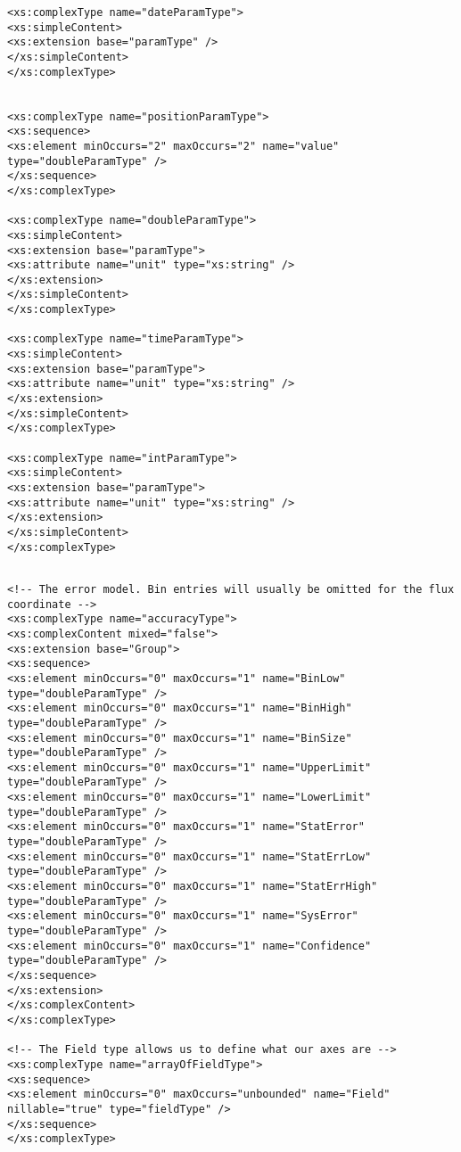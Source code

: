 {\begin{flushleft}
\begin{fmppage}
\begin{verbatim}
<xs:complexType name="dateParamType">
<xs:simpleContent>
<xs:extension base="paramType" />
</xs:simpleContent>
</xs:complexType>


<xs:complexType name="positionParamType">
<xs:sequence>
<xs:element minOccurs="2" maxOccurs="2" name="value" type="doubleParamType" />
</xs:sequence>
</xs:complexType>

<xs:complexType name="doubleParamType">
<xs:simpleContent>
<xs:extension base="paramType">
<xs:attribute name="unit" type="xs:string" />
</xs:extension>
</xs:simpleContent>
</xs:complexType>

<xs:complexType name="timeParamType">
<xs:simpleContent>
<xs:extension base="paramType">
<xs:attribute name="unit" type="xs:string" />
</xs:extension>
</xs:simpleContent>
</xs:complexType>

<xs:complexType name="intParamType">
<xs:simpleContent>
<xs:extension base="paramType">
<xs:attribute name="unit" type="xs:string" />
</xs:extension>
</xs:simpleContent>
</xs:complexType>

\end{verbatim}
\end{fmppage}

\begin{fmppage}
\begin{verbatim}

<!-- The error model. Bin entries will usually be omitted for the flux coordinate -->
<xs:complexType name="accuracyType">
<xs:complexContent mixed="false">
<xs:extension base="Group">
<xs:sequence>
<xs:element minOccurs="0" maxOccurs="1" name="BinLow" type="doubleParamType" />
<xs:element minOccurs="0" maxOccurs="1" name="BinHigh" type="doubleParamType" />
<xs:element minOccurs="0" maxOccurs="1" name="BinSize" type="doubleParamType" />
<xs:element minOccurs="0" maxOccurs="1" name="UpperLimit" type="doubleParamType" />
<xs:element minOccurs="0" maxOccurs="1" name="LowerLimit" type="doubleParamType" />
<xs:element minOccurs="0" maxOccurs="1" name="StatError" type="doubleParamType" />
<xs:element minOccurs="0" maxOccurs="1" name="StatErrLow" type="doubleParamType" />
<xs:element minOccurs="0" maxOccurs="1" name="StatErrHigh" type="doubleParamType" />
<xs:element minOccurs="0" maxOccurs="1" name="SysError" type="doubleParamType" />
<xs:element minOccurs="0" maxOccurs="1" name="Confidence" type="doubleParamType" />
</xs:sequence>
</xs:extension>
</xs:complexContent>
</xs:complexType>

<!-- The Field type allows us to define what our axes are -->
<xs:complexType name="arrayOfFieldType">
<xs:sequence>
<xs:element minOccurs="0" maxOccurs="unbounded" name="Field" nillable="true" type="fieldType" />
</xs:sequence>
</xs:complexType>


\end{verbatim}
\end{fmppage}
\end{flushleft}}
